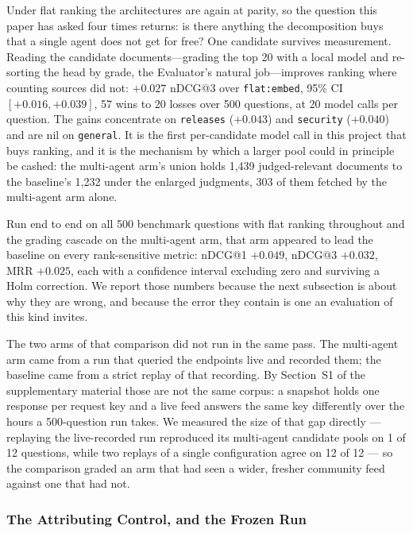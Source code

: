 \documentclass[acmsmall,review,anonymous,screen]{acmart}
\begin{document}
Under flat ranking the architectures are again at parity, so the question this
paper has asked four times returns: is there anything the decomposition buys
that a single agent does not get for free? One candidate survives measurement.
Reading the candidate documents---grading the top 20 with a local model and
re-sorting the head by grade, the Evaluator's natural job---improves ranking
where counting sources did not: $+0.027$ nDCG@3 over \texttt{flat:embed},
95\% CI $[+0.016, +0.039]$, 57 wins to 20 losses over 500 questions, at 20
model calls per question. The gains concentrate on \texttt{releases}
($+0.043$) and \texttt{security} ($+0.040$) and are nil on \texttt{general}.
It is the first per-candidate model call in this project that buys ranking,
and it is the mechanism by which a larger pool could in principle be cashed:
the multi-agent arm's union holds 1{,}439 judged-relevant documents to the
baseline's 1{,}232 under the enlarged judgments, 303 of them fetched by the
multi-agent arm alone.

Run end to end on all 500 benchmark questions with flat ranking throughout and
the grading cascade on the multi-agent arm, that arm appeared to lead the
baseline on every rank-sensitive metric: nDCG@1 $+0.049$, nDCG@3 $+0.032$, MRR
$+0.025$, each with a confidence interval excluding zero and surviving a Holm
correction. We report those numbers because the next subsection is about why
they are wrong, and because the error they contain is one an evaluation of this
kind invites.

The two arms of that comparison did not run in the same pass. The multi-agent
arm came from a run that queried the endpoints live and recorded them; the
baseline came from a strict replay of that recording. By
Section~S1 of the supplementary material those are not the same corpus: a snapshot holds one
response per request key and a live feed answers the same key differently over
the hours a 500-question run takes. We measured the size of that gap directly
--- replaying the live-recorded run reproduced its multi-agent candidate pools
on 1 of 12 questions, while two replays of a single configuration agree on 12
of 12 --- so the comparison graded an arm that had seen a wider, fresher
community feed against one that had not.

\subsubsection{The Attributing Control, and the Frozen Run}\label{sec:tier-control}
\end{document}
